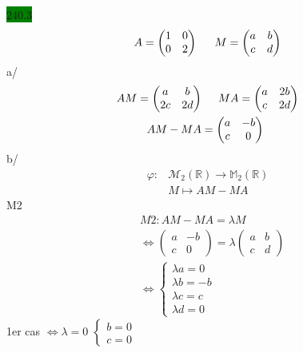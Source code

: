 \documentclass{article}
\begin{document}
\noindent \colorbox{green}{240.3}\\
\begin{equation*}
    A = \begin{pmatrix}
        1&0\\0&2
    \end{pmatrix} \indent
    M = \begin{pmatrix}
        a&b\\c&d
    \end{pmatrix}
\end{equation*}
a/ \begin{align*}
    AM = \begin{pmatrix}
        a&b\\2c&2d
    \end{pmatrix} &\indent MA = \begin{pmatrix}
        a&2b\\c&2d
    \end{pmatrix}\\
    AM - MA &= \begin{pmatrix}
        a&-b\\c&0
    \end{pmatrix}
\end{align*}
b/ \begin{align*}
    \varphi: &\mathcal{M}_2(\mathbb{R}) \to \mathbb{M}_2(\mathbb{R})\\
    &M \mapsto AM - MA
\end{align*}
M2 \begin{align*}
    &M2 : AM - MA = \lambda M\\
    &\Leftrightarrow \begin{pmatrix}
        a&-b\\c&0
    \end{pmatrix} = \lambda \begin{pmatrix}
        a & b \\ c & d
    \end{pmatrix}\\
    &\Leftrightarrow \begin{cases}
        \lambda a = 0 \\ \lambda b = -b \\ \lambda c = c \\ \lambda d = 0
    \end{cases}
\end{align*}
1er cas \(\Leftrightarrow \lambda = 0\) \(
\begin{cases}
    b = 0 \\
    c = 0
\end{cases}\)\\
\end{document}
